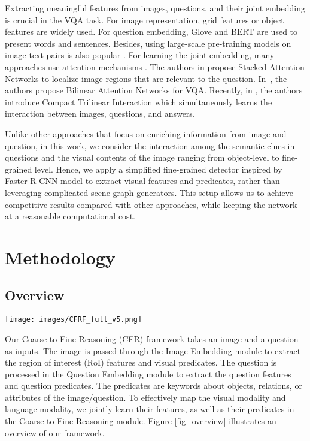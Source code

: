\documentclass[10pt,twocolumn,letterpaper]{article}
\begin{document}
Extracting meaningful features from images, questions, and their joint embedding is crucial in the VQA task. For image representation, grid features \cite{jiang2020defense,zhu2016visual7w} or object features \cite{bottom-up2017,do2018affordancenet,tip-trick,nguyen2019object,Ren2015FasterRCNN} are  widely used. For question embedding, Glove \cite{pennington2014glove} and BERT \cite{Devlin2019BERTPO} are used to present words and sentences. Besides, using large-scale pre-training models on image-text pairs is also popular \cite{li2020oscar,chen2020uniter}.
For learning the joint embedding, many approaches use attention mechanisms \cite{teney2017graphvqa,tan2019lxmert,nguyen2019v2cnet,Kim2018BilinearAN, do2019cti,zheng2020cross,zhang2021dmrfnet}. The authors in \cite{Yang2016StackedAN} propose Stacked Attention Networks to localize image regions that are relevant to the question. In~\cite{Kim2018BilinearAN}, the authors propose Bilinear Attention Networks for VQA.
Recently, in \cite{do2019cti}, the authors introduce Compact Trilinear Interaction which simultaneously learns the interaction between images, questions, and answers.

Unlike other approaches that focus on enriching information from image and question, in this work, we consider the interaction among the semantic clues in questions and the visual contents of the image ranging from object-level to fine-grained level. Hence, we apply a simplified fine-grained detector inspired by Faster R-CNN model \cite{Ren2015FasterRCNN} to extract visual features and predicates, rather than leveraging complicated scene graph generators. This setup allows us to achieve competitive results compared with other approaches, while keeping the network at a reasonable computational cost.

\section{Methodology}
\label{sec:input_rep}
\subsection{Overview}

\begin{figure*}[!ht]
    \centering
    \texttt{[image: images/CFRF\_full\_v5.png]}
    \caption{An overview of our framework.}
    \label{fig_overview}
\end{figure*}

Our Coarse-to-Fine Reasoning (CFR) framework takes an image and a question as inputs. The image is passed through the Image Embedding module to extract the region of interest (RoI) features and visual predicates. The question is processed in the Question Embedding module to extract the question features and question predicates. The predicates are keywords about objects, relations, or attributes of the image/question. To effectively map the visual modality and language modality, we jointly learn their features, as well as their predicates in the Coarse-to-Fine Reasoning module. Figure \ref{fig_overview} illustrates an overview of our framework. 
\end{document}
